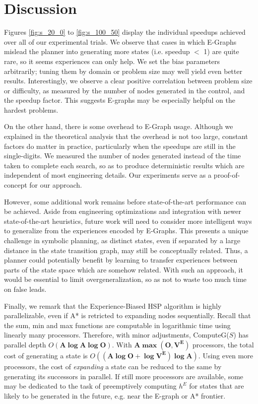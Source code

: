 \documentclass[letterpaper]{article}
\begin{document}
\section{Discussion}

Figures \ref{fig:s_20_0} to \ref{fig:s_100_50} display the individual speedups achieved over all of our experimental trials. We observe that cases in which E-Graphs mislead the planner into generating more states (i.e. speedup $<$ 1) are quite rare, so it seems experiences can only help. We set the bias parameters arbitrarily; tuning them by domain or problem size may well yield even better results. Interestingly, we observe a clear positive correlation between problem size or difficulty, as measured by the number of nodes generated in the control, and the speedup factor. This suggests E-graphs may be especially helpful on the hardest problems.

On the other hand, there is some overhead to E-Graph usage.
Although we explained in the theoretical analysis that the overhead is not too large, constant factors do matter in practice, particularly when the speedups are still in the single-digits.
We measured the number of nodes generated instead of the time taken to complete each search, so as to produce deterministic results which are independent of most engineering details.
Our experiments serve as a proof-of-concept for our approach.

However, some additional work remains before state-of-the-art performance can be achieved.
Aside from engineering optimizations and integration with newer state-of-the-art heuristics, future work will need to consider more intelligent ways to generalize from the experiences encoded by E-Graphs.
This presents a unique challenge in symbolic planning, as distinct states, even if separated by a large distance in the state transition graph, may still be conceptually related.
Thus, a planner could potentially benefit by learning to transfer experiences between parts of the state space which are somehow related.
With such an approach, it would be essential to limit overgeneralization, so as not to waste too much time on false leads.

Finally, we remark that the Experience-Biased HSP algorithm is highly parallelizable, even if A* is retricted to expanding nodes sequentially. Recall that the sum, min and max functions are computable in logarithmic time using linearly many processors. Therefore, with minor adjustments, ComputeG($S$) has parallel depth $O(\mathbf{A\log A\log O})$. With $\mathbf{A\max(O,V^E)}$ processors, the total cost of generating a state is $O(\mathbf{(A\log O + \log V^E)\log A})$. Using even more processors, the cost of \textit{expanding} a state can be reduced to the same by generating its successors in parallel. If still more processors are available, some may be dedicated to the task of preemptively computing $h^E$ for states that are likely to be generated in the future, e.g. near the E-graph or A* frontier.
\end{document}

